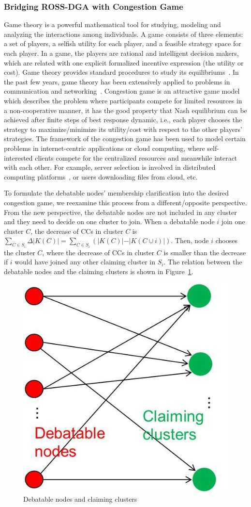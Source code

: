 \documentclass[times]{ettauth}
\newcommand{\ie}{i.e., }
\theoremstyle{mytheoremstyle}
\theoremstyle{mytheoremstyle}
\theoremstyle{mytheoremstyle}
\begin{document}
\subsubsection{Bridging ROSS-DGA with Congestion Game}
\label{clustering:phaseII:game}
Game theory is a powerful mathematical tool for studying, modeling and analyzing the interactions among individuals.
A game consists of three elements: a set of players, a selfish utility for each player, and a feasible strategy space for each player. In a game, the players are rational and intelligent decision makers, which are related with one explicit formalized incentive expression (the utility or cost).
Game theory provides standard procedures to study its equilibriums~\cite{game_for_communication_01}.
In the past few years, game theory has been extensively applied to problems in communication and networking~\cite{Neel06analysisand, Wang_gtc_crn_survey_2010}.
Congestion game is an attractive game model which describes the problem where participants compete for limited resources in a non-cooperative manner, it has the good property that Nash equilibrium can be achieved after finite steps of best response dynamic, \ie each player chooses the strategy to maximize/minimize its utility/cost with respect to the other players' strategies.
The framework of the congestion game has been used to model certain problems in internet-centric applications or cloud computing, where self-interested clients compete for the centralized resources and meanwhile interact with each other.
For example, server selection is involved in distributed computing platforms~\cite{Cloud_Computing_2010}, or users downloading files from cloud, etc.

To formulate the debatable nodes' membership clarification into the desired congestion game, we reexamine this process from a different/opposite perspective. 
From the new perspective, the debatable nodes are not included in any cluster and they need to decide on one cluster to join.
When a debatable node $i$ join one cluster $C$, the decrease of CCs in cluster $C$ is $\sum_{C\in S_i}\Delta\vert K(C) \vert=\sum_{C\in S_i}({\vert K(C) \vert-\vert K(C\cup i) \vert})$.
Then, node $i$ chooses the cluster $C$, where the decrease of CCs in cluster $C$ is smaller than the decrease if $i$ would have joined any other claiming cluster in $S_i$.
The relation between the debatable nodes and the claiming clusters is shown in Figure~\ref{debatable_nodes_claiming_cluster}.
\begin{figure}[ht!]
  \centering
  \includegraphics[width=0.25\linewidth]{singletongame_png.png}
  \caption{Debatable nodes and claiming clusters}
  \label{debatable_nodes_claiming_cluster}
\end{figure}
\end{document}
